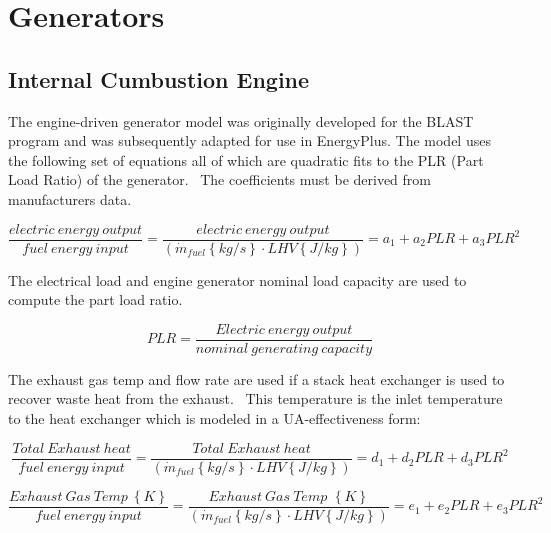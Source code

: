 \section{Generators}\label{generators}

\subsection{Internal Cumbustion Engine}\label{internal-cumbustion-engine}

The engine-driven generator model was originally developed for the BLAST program and was subsequently adapted for use in EnergyPlus. The model uses the following set of equations all of which are quadratic fits to the PLR (Part Load Ratio) of the generator.~ The coefficients must be derived from manufacturers data.

\begin{equation}
\frac{{electric~energy~output}}{{fuel~energy~input}} = \frac{{electric~energy~output}}{{\left( {{{\dot m}_{fuel}}\left\{ {kg/s} \right\} \cdot LHV\left\{ {J/kg} \right\}} \right)}} = {a_1} + {a_2}PLR + {a_3}PL{R^2}
\end{equation}

The electrical load and engine generator nominal load capacity are used to compute the part load ratio.

\begin{equation}
PLR = \frac{{Electric~energy~output}}{{nominal~generating~capacity}}
\end{equation}

The exhaust gas temp and flow rate are used if a stack heat exchanger is used to recover waste heat from the exhaust.~ This temperature is the inlet temperature to the heat exchanger which is modeled in a UA-effectiveness form:

\begin{equation}
\frac{{Total~Exhaust~heat}}{{fuel~energy~input}} = \frac{{Total~Exhaust~heat}}{{\left( {{{\dot m}_{fuel}}\left\{ {kg/s} \right\} \cdot LHV\left\{ {J/kg} \right\}} \right)}} = {d_1} + {d_2}PLR + {d_3}PL{R^2}
\end{equation}

\begin{equation}
\frac{{Exhaust~Gas~Temp~\left\{ K \right\}}}{{fuel~energy~input}} = \frac{{Exhaust~Gas~Temp\,\,\left\{ K \right\}}}{{\left( {{{\dot m}_{fuel}}\left\{ {kg/s} \right\} \cdot LHV\left\{ {J/kg} \right\}} \right)}} = {e_1} + {e_2}PLR + {e_3}PL{R^2}
\end{equation}

